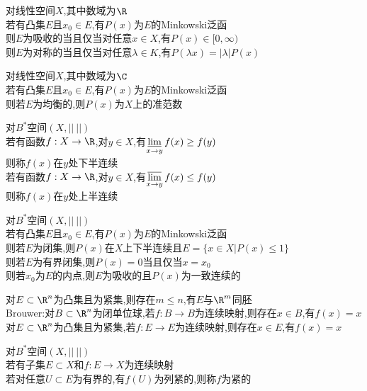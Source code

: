 \begin{dingli}
对线性空间$X$,其中数域为$\R$\\
若有凸集$E$且$x_0\in E$,有$P(x)$为$E$的Minkowski泛函\\
则$E$为吸收的当且仅当对任意$x\in X$,有$P(x)\in [0,\infty)$\\
则$E$为对称的当且仅当对任意$\lambda\in K$,有$P(\lambda x)=|\lambda|P(x)$
\end{dingli}

\begin{dingli}
对线性空间$X$,其中数域为$\C$\\
若有凸集$E$且$x_0\in E$,有$P(x)$为$E$的Minkowski泛函\\
则若$E$为均衡的,则$P(x)$为$X$上的准范数
\end{dingli}

\begin{dingyi}
对$B^*$空间$(X,||\ ||)$\\
若有函数$f:X\to \R$,对$y\in X$,有$\varliminf\limits_{x\to y}f(x)\geq f(y)$\\
则称$f(x)$在$y$处下半连续\\
若有函数$f:X\to \R$,对$y\in X$,有$\varlimsup\limits_{x\to y}f(x)\leq f(y)$\\
则称$f(x)$在$y$处上半连续
\end{dingyi}

\begin{dingli}
对$B^*$空间$(X,||\ ||)$\\
若有凸集$E$且$x_0\in E$,有$P(x)$为$E$的Minkowski泛函\\
则若$E$为闭集,则$P(x)$在$X$上下半连续且$E=\{x\in X|P(x)\leq 1\}$\\
则若$E$为有界闭集,则$P(x)=0$当且仅当$x=x_0$\\
则若$x_0$为$E$的内点,则$E$为吸收的且$P(x)$为一致连续的
\end{dingli}

\begin{zhu}
对$E\subset \R^n$为凸集且为紧集,则存在$m\leq n$,有$E$与$\R^m$同胚\\
Brouwer:对$B\subset\R^n$为闭单位球,若$f:B\to B$为连续映射,则存在$x\in B$,有$f(x)=x$\\
对$E\subset \R^n$为凸集且为紧集,若$f:E\to E$为连续映射,则存在$x\in E$,有$f(x)=x$
\end{zhu}

\begin{dingyi}
对$B^*$空间$(X,||\ ||)$\\
若有子集$E\subset X$和$f:E\to X$为连续映射\\
若对任意$U\subset E$为有界的,有$f(U)$为列紧的,则称$f$为紧的
\end{dingyi}

